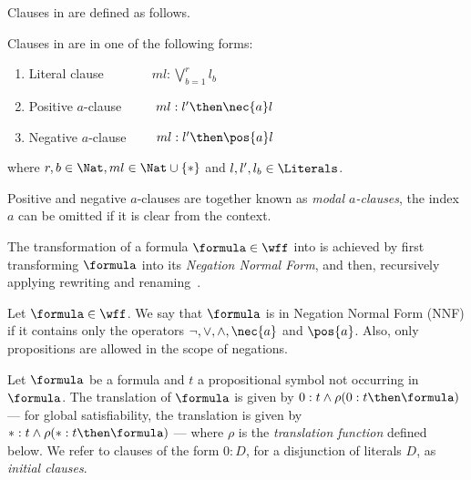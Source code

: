 Clauses in  are defined as follows.

\begin{definition}
    Clauses in  are in one of the following forms:
    \begin{enumerate}
        \item Literal clause $\ \ \quad \qquad ml : \bigvee^r_{b=1} l_b$
        \item Positive $a$-clause $\ \qquad ml : l' \then \nec{a} l$
        \item Negative $a$-clause $\qquad ml : l' \then \pos{a} l$
    \end{enumerate}
    where $r, b \in \Nat, ml \in \Nat \cup \{*\}$ and $l, l', l_b \in
    \Literals$.
\end{definition}

Positive and negative $a$-clauses are together known as \emph{modal
$a$-clauses}, the index $a$ can be omitted if it is clear from the context.

The transformation of a formula $\formula \in \wff$ into  is achieved
by first transforming $\formula$ into its \emph{Negation Normal Form}, and then,
recursively applying rewriting and renaming~\cite{plaisted1986structure}.

\begin{definition}
    Let $\formula \in \wff$. We say that $\formula$ is in Negation Normal Form (NNF) if
    it contains only the operators $\neg, \lor, \land, \nec{a}$ and $\pos{a}$. Also,
    only propositions are allowed in the scope of negations.
\end{definition}

Let $\formula$ be a formula and $t$ a propositional symbol not occurring in
$\formula$. The translation of $\formula$ is given by $0 : t \land \rho(0 : t
\then \formula)$ --- for global satisfiability, the translation is given by $* :
t \land \rho(* : t \then \formula)$ --- where $\rho$ is the \emph{translation
function} defined below. We refer to clauses of the form $0 : D$, for a
disjunction of literals $D$, as \emph{initial clauses}. 


